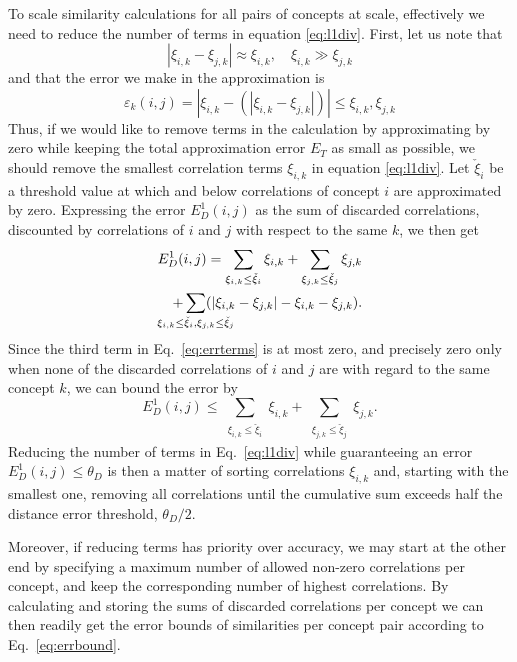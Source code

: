 \documentclass[conference]{IEEEtran}
\begin{document}
To scale similarity calculations for all pairs of concepts at scale, effectively we need to reduce the number of terms in equation \ref{eq:l1div}. First, let us note that
\begin{equation}
\label{eq:corrapprox}
| \xi_{i,k} - \xi_{j,k} | \approx \xi_{i,k}, \quad \xi_{i,k} \gg \xi_{j,k}
\end{equation}
and that the error we make in the approximation is
\begin{equation}
\label{eq:corrapproxbound}
\varepsilon_k(i, j) = | \xi_{i,k} - (| \xi_{i,k} - \xi_{j,k} | ) | \leq \xi_{i,k}, \xi_{j,k}
\end{equation}
Thus, if we would like to remove terms in the calculation by approximating by zero while keeping the total approximation error $E_T$ as small as possible, we should remove the smallest correlation terms $\xi_{i,k}$ in equation \ref{eq:l1div}. Let $\check{\xi}_{i}$ be a threshold value at which and below correlations of concept $i$ are approximated by zero. Expressing the error $E_D^1(i,j)$ as the sum of discarded correlations, discounted by correlations of $i$ and $j$ with respect to the same $k$, we then get
\begin{equation} \label{eq:errterms}
\begin{split}
E_D^1(i,j) = 
\sum_{ \substack{\xi_{i,k} \leq \check{\xi}_{i}} } \xi_{i,k}  +
\sum_{ \substack{\xi_{j,k} \leq \check{\xi}_{j}} } \xi_{j,k} \\
+ \sum_{\mathclap{\xi_{i,k} \leq \check{\xi}_{i}, \xi_{j,k} \leq \check{\xi}_{j} }} (| \xi_{i,k} - \xi_{j,k} | - \xi_{i,k} - \xi_{j,k}).
\end{split}
\end{equation}
Since the third term in Eq.\ \ref{eq:errterms} is at most zero, and precisely zero only when none of the discarded correlations of $i$ and $j$ are with regard to the same concept $k$, we can bound the error by
\begin{equation} \label{eq:errbound}
E_D^1(i,j) \leq 
\sum_{ \substack{\xi_{i,k} \leq \check{\xi}_{i}} } \xi_{i,k}  +
\sum_{ \substack{\xi_{j,k} \leq \check{\xi}_{j}} } \xi_{j,k}.
\end{equation}
Reducing the number of terms in Eq.\ \ref{eq:l1div} while guaranteeing an error $E_D^1(i,j) \leq \theta_D$ is then a matter of sorting correlations $\xi_{i,k}$ and, starting with the smallest one, removing all correlations until the cumulative sum exceeds half the distance error threshold, $\theta_D/2$. 

Moreover, if reducing terms has priority over accuracy, we may start at the other end by specifying a maximum number of allowed non-zero correlations per concept, and keep the corresponding number of highest correlations. By calculating and storing the sums of discarded correlations per concept we can then readily get the error bounds of similarities per concept pair according to Eq.\ \ref{eq:errbound}.
\end{document}
